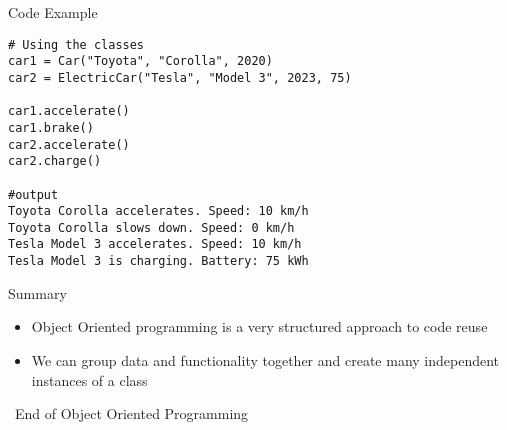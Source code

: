 \documentclass[serif, aspectratio=169]{beamer}
\begin{document}
\begin{frame}[fragile]{Code Example}
    \begin{lstlisting}
# Using the classes
car1 = Car("Toyota", "Corolla", 2020)
car2 = ElectricCar("Tesla", "Model 3", 2023, 75)
	
car1.accelerate()
car1.brake()
car2.accelerate()
car2.charge()
	
#output
Toyota Corolla accelerates. Speed: 10 km/h
Toyota Corolla slows down. Speed: 0 km/h
Tesla Model 3 accelerates. Speed: 10 km/h
Tesla Model 3 is charging. Battery: 75 kWh	
    \end{lstlisting}
\end{frame}

\begin{frame}{Summary}
    \begin{itemize}
        \item Object Oriented programming is a very structured approach to code reuse
        \item We can group data and functionality together and create many independent instances of a class
        
    \end{itemize}
\end{frame}

\begin{frame}
    \begin{center}
        {\Huge\ End of Object Oriented Programming}
    \end{center}
\end{frame}
\end{document}
